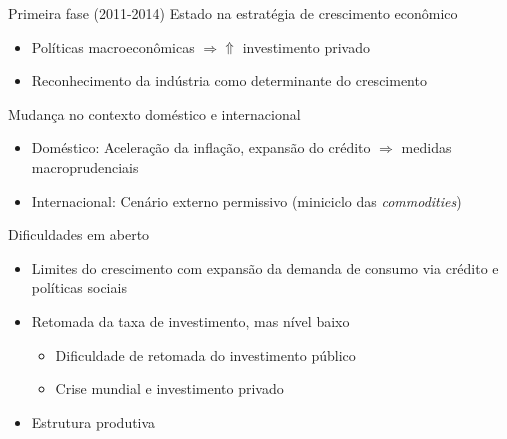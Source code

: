 \documentclass[presentation]{beamer}
\begin{document}
\begin{frame}[label={sec:org687622e}]{Primeira fase (2011-2014)}
\alert{Estado} na estratégia de crescimento econômico
\begin{itemize}
\item Políticas macroeconômicas \(\Rightarrow \Uparrow\) investimento privado
\item Reconhecimento da \alert{indústria} como determinante do crescimento
\end{itemize}

\begin{block}{Mudança no contexto doméstico e internacional}
\begin{itemize}
\item \alert{Doméstico:} Aceleração da inflação, expansão do crédito \(\Rightarrow\) medidas macroprudenciais
\item \alert{Internacional:} Cenário externo permissivo (miniciclo das \emph{commodities})
\end{itemize}
\end{block}
\end{frame}


\begin{frame}[label={sec:orgbd2455e}]{Dificuldades em aberto \cite{mello_2017_industrialismo}}
\begin{itemize}
\item Limites do crescimento com expansão da demanda de consumo via crédito e políticas sociais
\item Retomada da taxa de investimento, mas nível baixo
\begin{itemize}
\item Dificuldade de retomada do investimento público
\item Crise mundial e investimento privado
\end{itemize}
\item Estrutura produtiva
\end{itemize}
\end{frame}
\end{document}
